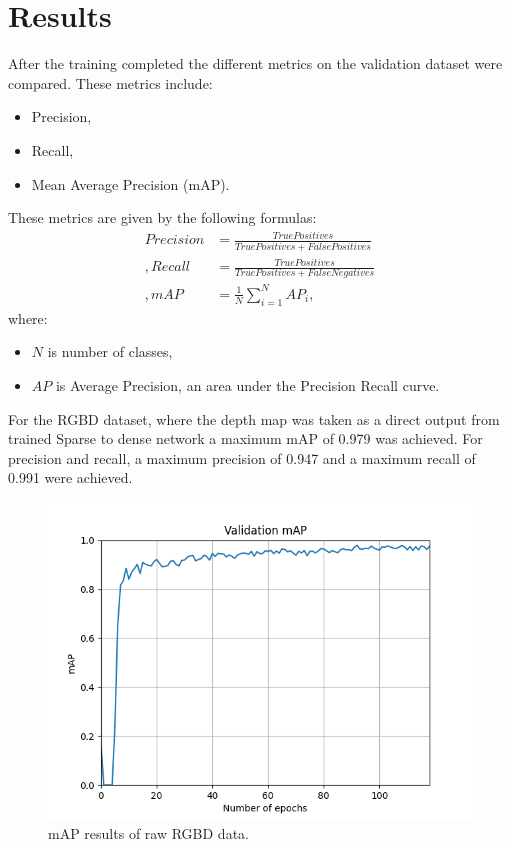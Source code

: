 \documentclass[twoside]{ctuthesis}
\theoremstyle{plain}
\theoremstyle{definition}
\theoremstyle{note}
\begin{document}
\chapter{Results}
After the training completed the different metrics on the validation dataset were compared. These metrics include:
\begin{itemize}
	\item Precision,
	\item Recall,
	\item Mean Average Precision (mAP).
\end{itemize}
These metrics are given by the following formulas:
\begin{equation}
\begin{aligned}
	Precision &= \frac{True Positives}{True Positives + False Positives}\\,
	Recall &= \frac{True Positives}{True Positives + False Negatives}\\,
	mAP &= \frac{1}{N}\sum^N_{i=1}AP_i,
\end{aligned}
\end{equation}
where:
\begin{itemize}
	\item $N$ is number of classes,
	\item $AP$ is Average Precision, an area under the Precision Recall curve.
\end{itemize}
For the RGBD dataset, where the depth map was taken as a direct output from trained Sparse to dense network a maximum mAP of 0.979 was achieved. For precision and recall, a maximum precision of 0.947 and a maximum recall of 0.991 were achieved.
\begin{figure}[h!]
	\centering
	\includegraphics[width=\textwidth]{run-no_depth120e-tag-validation_mAP.png}
	\caption{mAP results of raw RGBD data.}
\end{figure}
\end{document}

